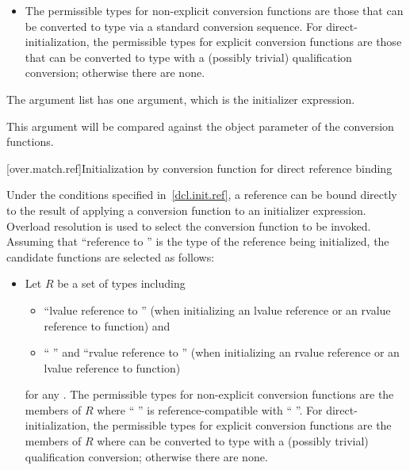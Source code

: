 \begin{itemize}
\item
The permissible types for non-explicit conversion functions are
those that can be converted to type 
via a standard conversion sequence.
For direct-initialization,
the permissible types for explicit conversion functions are
those that can be converted to type 
with a (possibly trivial) qualification conversion;
otherwise there are none.
\end{itemize}

\pnum
The argument list has one argument, which is the initializer expression.
\begin{note}
This argument will be compared against
the object parameter of the conversion functions.
\end{note}

[over.match.ref]{Initialization by conversion function for direct reference binding}%

\pnum
Under the conditions specified in~\ref{dcl.init.ref}, a reference can be bound directly
to the result of applying a conversion
function to an initializer expression.
Overload resolution is used to select the
conversion function to be invoked.
Assuming that ``reference to  '' is the
type of the reference being initialized,
the candidate functions are selected as follows:
\begin{itemize}
\item
Let $R$ be a set of types including
\begin{itemize}
\item
``lvalue reference to  ''
(when initializing an lvalue reference or an rvalue reference to function) and
\item
`` ''
and ``rvalue reference to  '' (when initializing an
rvalue reference or an lvalue reference to function)
\end{itemize}
for any .
The permissible types for non-explicit conversion functions are
the members of $R$
where `` '' is reference-compatible
with `` ''.
For direct-initialization, the permissible types for explicit
conversion functions are the members of $R$
where  can be converted to type 
with a (possibly trivial) qualification conversion;
otherwise there are none.
\end{itemize}

